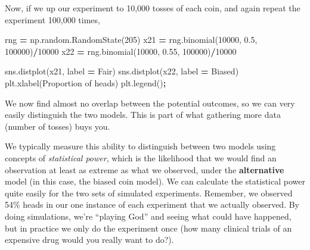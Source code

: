 \documentclass[
  letterpaper,
]{scrbook}
\newenvironment{Shaded}{\begin{snugshade}}{\end{snugshade}}
\newcommand{\DecValTok}[1]{\textcolor[rgb]{0.00,0.00,0.81}{#1}}
\newcommand{\FloatTok}[1]{\textcolor[rgb]{0.00,0.00,0.81}{#1}}
\newcommand{\NormalTok}[1]{#1}
\newcommand{\OperatorTok}[1]{\textcolor[rgb]{0.81,0.36,0.00}{\textbf{#1}}}
\newcommand{\StringTok}[1]{\textcolor[rgb]{0.31,0.60,0.02}{#1}}
\begin{document}
Now, if we up our experiment to 10,000 tosses of each coin, and again repeat the experiment 100,000 times,

\begin{Shaded}
\begin{Highlighting}[]
\NormalTok{rng }\OperatorTok{=}\NormalTok{ np.random.RandomState(}\DecValTok{205}\NormalTok{)}
\NormalTok{x21 }\OperatorTok{=}\NormalTok{ rng.binomial(}\DecValTok{10000}\NormalTok{, }\FloatTok{0.5}\NormalTok{, }\DecValTok{100000}\NormalTok{)}\OperatorTok{/}\DecValTok{10000}
\NormalTok{x22 }\OperatorTok{=}\NormalTok{ rng.binomial(}\DecValTok{10000}\NormalTok{, }\FloatTok{0.55}\NormalTok{, }\DecValTok{100000}\NormalTok{)}\OperatorTok{/}\DecValTok{10000}

\NormalTok{sns.distplot(x21, label }\OperatorTok{=} \StringTok{\textquotesingle{}Fair\textquotesingle{}}\NormalTok{)}
\NormalTok{sns.distplot(x22, label }\OperatorTok{=} \StringTok{\textquotesingle{}Biased\textquotesingle{}}\NormalTok{)}
\NormalTok{plt.xlabel(}\StringTok{\textquotesingle{}Proportion of heads\textquotesingle{}}\NormalTok{)}
\NormalTok{plt.legend()}\OperatorTok{;}
\end{Highlighting}
\end{Shaded}

We now find almost no overlap between the potential outcomes, so we can very easily distinguish the two models. This is part of what gathering more data (number of tosses) buys you.

We typically measure this ability to distinguish between two models using concepts of \emph{statistical power}, which is the likelihood that we would find an observation at least as extreme as what we observed, under the \textbf{alternative} model (in this case, the biased coin model). We can calculate the statistical power quite easily for the two sets of simulated experiments. Remember, we observed 54\% heads in our one instance of each experiment that we actually observed. By doing simulations, we're ``playing God'' and seeing what could have happened, but in practice we only do the experiment once (how many clinical trials of an expensive drug would you really want to do?).
\end{document}
